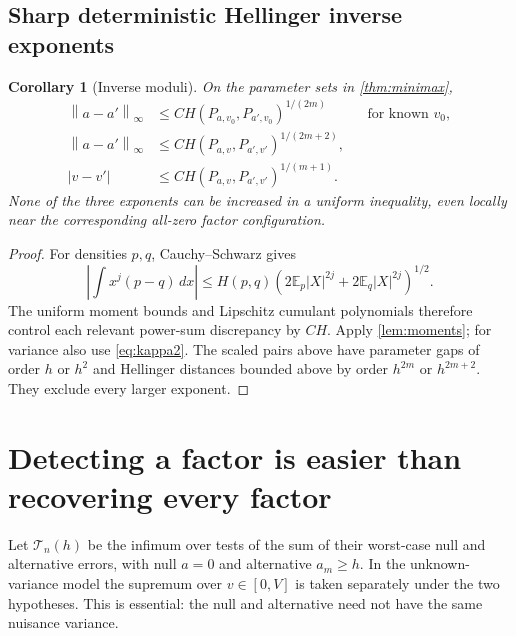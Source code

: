 \documentclass[11pt,a4paper]{article}
\numberwithin{equation}{section}
\newtheorem{corollary}[theorem]{Corollary}
\theoremstyle{definition}
\theoremstyle{remark}
\newcommand{\E}{\mathbb E}
\newcommand{\norm}[1]{\left\lVert#1\right\rVert}
\begin{document}
\subsection{Sharp deterministic Hellinger inverse exponents}
\begin{corollary}[Inverse moduli]
\label{cor:H-inverse}
On the parameter sets in \cref{thm:minimax},
\begin{align}
 \norm{a-a'}_\infty&\le C H(P_{a,v_0},P_{a',v_0})^{1/(2m)}
 &&\text{for known }v_0,\label{eq:mod-known}\\
 \norm{a-a'}_\infty&\le C H(P_{a,v},P_{a',v'})^{1/(2m+2)},
 \label{eq:mod-unknown}\\
 |v-v'|&\le C H(P_{a,v},P_{a',v'})^{1/(m+1)}.
 \label{eq:mod-var}
\end{align}
None of the three exponents can be increased in a uniform inequality,
even locally near the corresponding all-zero factor configuration.
\end{corollary}
\begin{proof}
For densities $p,q$, Cauchy--Schwarz gives
\[
 \left|\int x^j(p-q)\,dx\right|
 \le H(p,q)\left(2\E_p|X|^{2j}+2\E_q|X|^{2j}\right)^{1/2}.
\]
The uniform moment bounds and Lipschitz cumulant polynomials therefore
control each relevant power-sum discrepancy by $CH$. Apply
\cref{lem:moments}; for variance also use \eqref{eq:kappa2}.
The scaled pairs above have parameter gaps of order $h$ or $h^2$ and
Hellinger distances bounded above by order $h^{2m}$ or $h^{2m+2}$.
They exclude every larger exponent.
\end{proof}

\section{Detecting a factor is easier than recovering every factor}
\label{sec:detection}

Let $\mathcal T_n(h)$ be the infimum over tests of the sum of their
worst-case null and alternative errors, with null $a=0$ and alternative
$a_m\ge h$. In the unknown-variance model the supremum over $v\in[0,V]$
is taken separately under the two hypotheses. This is essential: the
null and alternative need not have the same nuisance variance.
\end{document}
